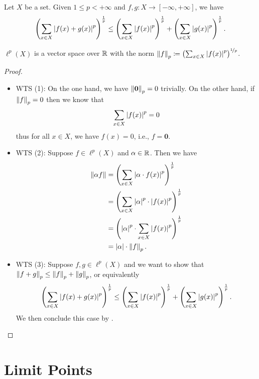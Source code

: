 \documentclass[screen]{techreport}
\numberwithin{equation}{section}
\begin{document}
\begin{theorem}\label{The:MinkowskisInequality}
	Let $X$ be a set.
	Given $1 \le p < +\infty$ and $f,g:X \to [-\infty,+\infty]$, we have
	\begin{equation}
		\left({ \sum_{x \in X} \left|{f(x)+g(x)}\right|^p }\right)^{\frac{1}{p}} \le \left({ \sum_{x \in X} \left|{f(x)}\right|^p }\right)^{\frac{1}{p}} + \left({ \sum_{x \in X} \left|{g(x)}\right|^p }\right)^{\frac{1}{p}}.
	\end{equation}
\end{theorem}

\begin{proposition}\label{Prop:lpVectorSpace}
	$\ell^p(X)$ is a vector space over $\mathbb{R}$ with the norm $\left\|{f}\right\|_p \coloneqq  \left({\sum_{x \in X} \left|{f(x)}\right|^p}\right)^{\nicefrac{1}{p}}$.
\end{proposition}
\begin{proof}\
	\begin{itemize}
		\item WTS (1):
		On the one hand, we have $\left\|{\mathbf{0}}\right\|_p = 0$ trivially.
		On the other hand, if $\left\|{f}\right\|_p = 0$ then we know that
		\[
		\sum_{x \in X} \left|{f(x)}\right|^p = 0
		\]
		thus for all $x \in X$, we have $f(x) = 0$, i.e., $f = \mathbf{0}$.
		
		\item WTS (2): Suppose $f \in \ell^p(X)$ and $\alpha \in \mathbb{R}$.
		Then we have
		\begin{align}
			\left\|{\alpha f}\right\| & = \left({\sum_{x \in X} \left|{\alpha \cdot f(x)}\right|^p}\right)^{\frac{1}{p}} \\
			& = \left({ \sum_{x \in X} \left|{\alpha}\right|^p \cdot \left|{f(x)}\right|^p}\right)^\frac{1}{p} \\
			& = \left({ \left|{\alpha}\right|^p \cdot \sum_{x \in X} \left|{f(x)}\right|^p }\right)^\frac{1}{p} \\
			& = \left|{\alpha}\right| \cdot \left\|{f}\right\|_p.
		\end{align}
		
		\item WTS (3): Suppose $f,g \in \ell^p(X)$ and we want to show that $\left\|{f+g}\right\|_p \le \left\|{f}\right\|_p+\left\|{g}\right\|_p$, or equivalently
		\[
		\left({ \sum_{x \in X} \left|{f(x) + g(x)}\right|^p }\right)^\frac{1}{p} \le \left({ \sum_{x \in X} \left|{f(x)}\right|^p}\right)^\frac{1}{p} + \left({ \sum_{x \in X} \left|{g(x)}\right|^p}\right)^\frac{1}{p}.
		\]
		We then conclude this case by .
	\end{itemize}
\end{proof}

\section{Limit Points}
\end{document}

